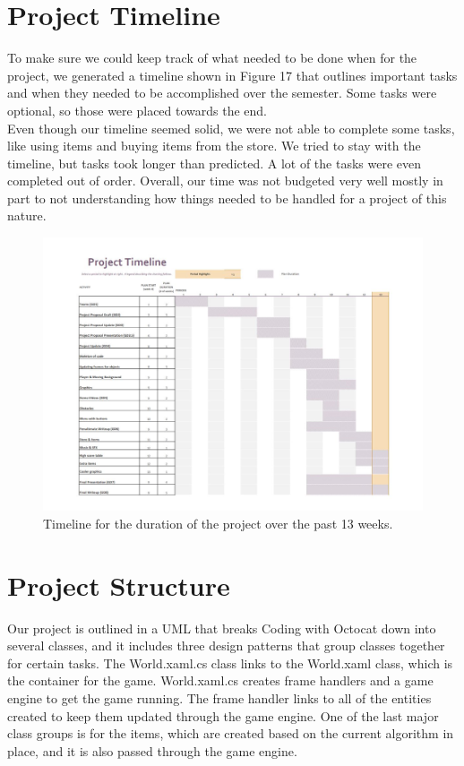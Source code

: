 \documentclass[10pt,conference,onecolumn,compsoc]{IEEEtran}
\begin{document}
\section{Project Timeline}
To make sure we could keep track of what needed to be done when for the project, we generated a timeline shown in Figure 17 that outlines important tasks and when they needed to be accomplished over the semester. Some tasks were optional, so those were placed towards the end.
\\

Even though our timeline seemed solid, we were not able to complete some tasks, like using items and buying items from the store. We tried to stay with the timeline, but tasks took longer than predicted. A lot of the tasks were even completed out of order. Overall, our time was not budgeted very well mostly in part to not understanding how things needed to be handled for a project of this nature.

\begin{figure}[!ht]
\centering
\includegraphics[scale=.7]{Timeline_Update}
\caption{Timeline for the duration of the project over the past 13 weeks.}
\end{figure}

\section{Project Structure}
Our project is outlined in a UML that breaks Coding with Octocat down into several classes, and it includes three design patterns that group classes together for certain tasks. The World.xaml.cs class links to the World.xaml class, which is the container for the game. World.xaml.cs creates frame handlers and a game engine to get the game running. The frame handler links to all of the entities created to keep them updated through the game engine. One of the last major class groups is for the items, which are created based on the current algorithm in place, and it is also passed through the game engine.
\end{document}
